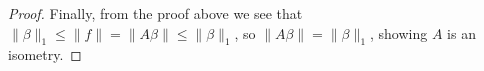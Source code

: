 \begin{proof}
	Finally, from the proof above we see that $\|\beta\|_1 \le \|f\| = \|A \beta\| \le \|\beta\|_1$, so $\|A \beta\| = \|\beta\|_1$, showing $A$ is an isometry.
\end{proof}

%
%
%
%
%
%


